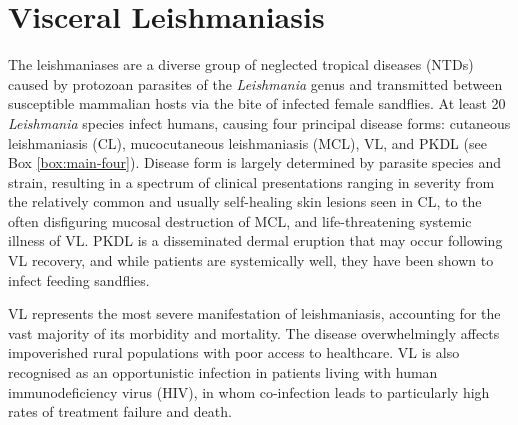 \section{Visceral Leishmaniasis}
The leishmaniases are a diverse group of neglected tropical diseases (NTDs) caused by protozoan parasites of the \textit{Leishmania} genus and transmitted between susceptible mammalian hosts via the bite of infected female sandflies\cite{pareyn2025}. At least 20 \textit{Leishmania} species infect humans, causing four principal disease forms: cutaneous leishmaniasis (CL), mucocutaneous leishmaniasis (MCL), VL, and PKDL (see Box \ref{box:main-four})\cite{farrar2023manson, burza2018, pareyn2025, who_leish}. Disease form is largely determined by parasite species and strain, resulting in a spectrum of clinical presentations ranging in severity from the relatively common and usually self-healing skin lesions seen in CL, to the often disfiguring mucosal destruction of MCL, and life-threatening systemic illness of VL. PKDL is a disseminated dermal eruption that may occur following VL recovery, and while patients are systemically well, they have been shown to infect feeding sandflies\cite{mondal2019, singh2021}.

VL represents the most severe manifestation of leishmaniasis, accounting for the vast majority of its morbidity and mortality. The disease overwhelmingly affects impoverished rural populations with poor access to healthcare. VL is also recognised as an opportunistic infection in patients living with human immunodeficiency virus (HIV), in whom co-infection leads to particularly high rates of treatment failure and death.

